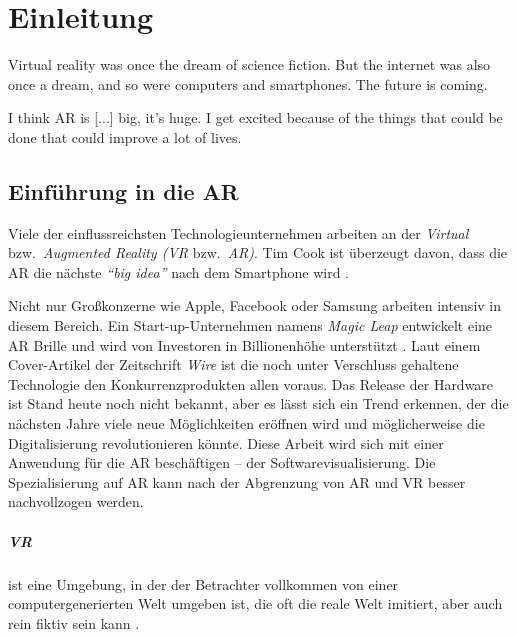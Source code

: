 \chapter{Einleitung}

\begin{fquote}
Virtual reality was once the dream of science fiction. But the internet was also once a dream, and so were computers and smartphones. The future is coming.
\end{fquote}

\begin{fquote}
I think AR is [...] big, it’s huge. I get excited because of the things that could be done that could improve a lot of lives.
\end{fquote}

\section{Einführung in die AR}
Viele der einflussreichsten Technologieunternehmen arbeiten an der \emph{Virtual} bzw.\ \emph{Augmented Reality (VR} bzw.\ \emph{AR)}. Tim Cook ist überzeugt davon, dass die AR die nächste \emph{``big idea''} nach dem Smartphone wird \cite{theindependent2017apple}.

Nicht nur Großkonzerne wie Apple, Facebook oder Samsung arbeiten intensiv in diesem Bereich. Ein Start-up-Unternehmen namens \emph{Magic Leap} entwickelt eine AR Brille und wird von Investoren in Billionenhöhe unterstützt \cite{kelly2016untold}. Laut einem Cover-Artikel der Zeitschrift \emph{Wire} ist die noch unter Verschluss gehaltene Technologie den Konkurrenzprodukten allen voraus. Das Release der Hardware ist Stand heute noch nicht bekannt, aber es lässt sich ein Trend erkennen, der die nächsten Jahre viele neue Möglichkeiten eröffnen wird und möglicherweise die Digitalisierung revolutionieren könnte.
Diese Arbeit wird sich mit einer Anwendung für die AR beschäftigen -- der Softwarevisualisierung. Die Spezialisierung auf AR kann nach der Abgrenzung von AR und VR besser nachvollzogen werden.

\paragraph{VR} ist eine Umgebung, in der der Betrachter vollkommen von einer computergenerierten Welt umgeben ist, die oft die reale Welt imitiert, aber auch rein fiktiv sein kann \cite{milgram1995augmented}.\\

